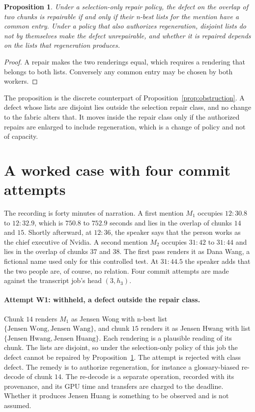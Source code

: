 \documentclass[11pt,openany]{book}
\newtheorem{proposition}{Proposition}[chapter]
\theoremstyle{remark}
\begin{document}
\begin{proposition}\label{prop:nbest}
Under a selection-only repair policy, the defect on the overlap of two chunks is repairable if and only if their n-best lists for the mention have a common entry. Under a policy that also authorizes regeneration, disjoint lists do not by themselves make the defect unrepairable, and whether it is repaired depends on the lists that regeneration produces.
\end{proposition}
\begin{proof}
A repair makes the two renderings equal, which requires a rendering that belongs to both lists. Conversely any common entry may be chosen by both workers.
\end{proof}

The proposition is the discrete counterpart of Proposition~\ref{prop:obstruction}. A defect whose lists are disjoint lies outside the selection repair class, and no change to the fabric alters that. It moves inside the repair class only if the authorized repairs are enlarged to include regeneration, which is a change of policy and not of capacity.

\section{A worked case with four commit attempts}

The recording is forty minutes of narration. A first mention $M_1$ occupies $12{:}30.8$ to $12{:}32.9$, which is $750.8$ to $752.9$ seconds and lies in the overlap of chunks $14$ and $15$. Shortly afterward, at $12{:}36$, the speaker says that the person works as the chief executive of Nvidia. A second mention $M_2$ occupies $31{:}42$ to $31{:}44$ and lies in the overlap of chunks $37$ and $38$. The first pass renders it as Dana Wang, a fictional name used only for this controlled test. At $31{:}44.5$ the speaker adds that the two people are, of course, no relation. Four commit attempts are made against the transcript job's head $(3,h_3)$.

\paragraph{Attempt W1: withheld, a defect outside the repair class.} Chunk $14$ renders $M_1$ as Jensen Wong with n-best list $\{\text{Jensen Wong},\text{Jensen Wang}\}$, and chunk $15$ renders it as Jensen Hwang with list $\{\text{Jensen Hwang},\text{Jensen Huang}\}$. Each rendering is a plausible reading of its chunk. The lists are disjoint, so under the selection-only policy of this job the defect cannot be repaired by Proposition~\ref{prop:nbest}. The attempt is rejected with class defect. The remedy is to authorize regeneration, for instance a glossary-biased re-decode of chunk $14$. The re-decode is a separate operation, recorded with its provenance, and its GPU time and transfers are charged to the deadline. Whether it produces Jensen Huang is something to be observed and is not assumed.
\end{document}
